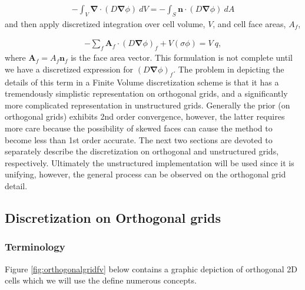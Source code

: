 \documentclass[11pt,letterpaper,titlepage]{article}
\newcommand{\bnabla}{\boldsymbol{\nabla}}
\numberwithin{equation}{section}
\begin{document}
\begin{equation}
\begin{aligned}
-\int_V \bnabla \cdot (D\bnabla\phi) \ dV = 
-\int_S \mathbf{n} \cdot (D\bnabla\phi) \ dA
\end{aligned}
\end{equation}
\newline 
and then apply discretized integration over cell volume, $V$, and cell face areas, $A_f$,

\begin{equation}\label{eq:fv_needface}
\begin{aligned}
-\sum_f \mathbf{A}_f \cdot (D\bnabla\phi)_f  + V (\sigma \phi) = V \ q,
\end{aligned}
\end{equation}
\newline 
where $\mathbf{A}_f = A_f \mathbf{n}_f$ is the face area vector. This formulation is not complete until we have a discretized expression for $(D\bnabla \phi)_f$. The problem in depicting the details of this term in a Finite Volume discretization scheme is that it has a tremendously simplistic representation on orthogonal grids, and a significantly more complicated representation in unstructured grids. Generally the prior (on orthogonal grids) exhibits 2nd order convergence, however, the latter requires more care because the possibility of skewed faces can cause the method to become less than 1st order accurate.
\newline
\newline 
The next two sections are devoted to separately describe the discretization on orthogonal and unstructured grids, respectively. Ultimately the unstructured implementation will be used since it is unifying, however, the general process can be observed on the orthogonal grid detail.

\newpage 
\subsection{Discretization on Orthogonal grids}
\subsubsection{Terminology}
Figure \ref{fig:orthogonalgridfv} below contains a graphic depiction of orthogonal 2D cells which we will use the define numerous concepts.
\end{document}
